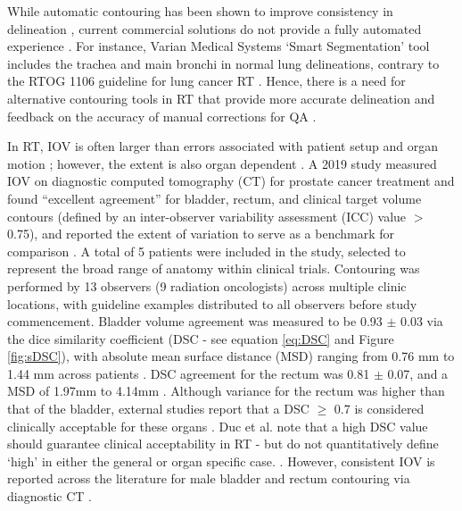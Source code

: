 While automatic contouring has been shown to improve consistency in delineation
\cite{Vinod_2016}, current commercial solutions do not provide a fully automated
experience \cite{Nemoto_2020}. For instance, Varian Medical Systems `Smart
Segmentation' tool includes the trachea and main bronchi in normal lung
delineations, contrary to the RTOG 1106 guideline for lung cancer RT
\cite{Nemoto_2020}. Hence, there is a need for alternative contouring tools in
RT that provide more accurate delineation \cite{Nemoto_2020} and feedback on the
accuracy of manual corrections for QA \cite{Nikolov_2018}.

In RT, IOV is often larger than errors associated with patient setup and organ
motion \cite{Vinod_2016, Murakami2013}; however, the extent is also organ
dependent \cite{Roach_2019}. A 2019 study measured IOV on diagnostic computed
tomography (CT) for prostate cancer treatment and found ``excellent agreement''
for bladder, rectum, and clinical target volume contours (defined by an
inter-observer variability assessment (ICC) value $>$ 0.75), and reported the
extent of variation to serve as a benchmark for comparison \cite{Roach_2019}. A
total of 5 patients were included in the study, selected to represent the broad
range of anatomy within clinical trials. Contouring was performed by 13
observers (9 radiation oncologists) across multiple clinic locations, with
guideline examples distributed to all observers before study commencement.
Bladder volume agreement was measured to be 0.93 $\pm$ 0.03 via the dice
similarity coefficient (DSC \cite{Dice1945} - see equation \ref{eq:DSC} and
Figure \ref{fig:sDSC}), with absolute mean surface distance (MSD) ranging from
0.76 mm to 1.44 mm across patients \cite{Roach_2019}. DSC agreement for the
rectum was 0.81 $\pm$ 0.07, and a MSD of 1.97mm to 4.14mm \cite{Roach_2019}.
Although variance for the rectum was higher than that of the bladder, external
studies report that a DSC $\geq$ 0.7 is considered clinically acceptable for
these organs \cite{Roach_2019, Sharp2014}. Duc et al. note that a high DSC value
should guarantee clinical acceptability in RT - but do not quantitatively define
`high' in either the general or organ specific case. \cite{Duc}. However,
consistent IOV is reported across the literature for male bladder and rectum
contouring via diagnostic CT \cite{Riegal2016}.



